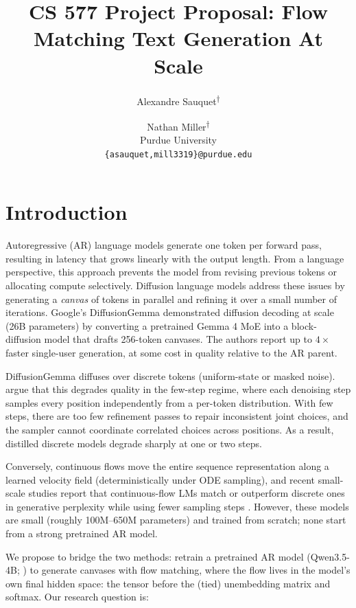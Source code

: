 \documentclass[11pt]{article}
\title{CS 577 Project Proposal: Flow Matching Text Generation At Scale}
\author{Alexandre Sauquet\textsuperscript{$\dagger$} \and Nathan Miller\textsuperscript{$\dagger$} \\
  Purdue University \\
  \texttt{\{asauquet,mill3319\}@purdue.edu}}
\begin{document}
\maketitle
\begingroup
\renewcommand\thefootnote{$\dagger$}
\endgroup

\section{Introduction}

Autoregressive (AR) language models generate one token per forward pass, resulting in latency that grows linearly with the output length. From a language perspective, this approach prevents the model from revising previous tokens or allocating compute selectively. Diffusion language models address these issues by generating a \emph{canvas} of tokens in parallel and refining it over a small number of iterations. Google's DiffusionGemma \citep{google2026diffusiongemma} demonstrated diffusion decoding at scale (26B parameters) by converting a pretrained Gemma 4 MoE into a block-diffusion model that drafts 256-token canvases. The authors report up to  $4\times$ faster single-user generation, at some cost in quality relative to the AR parent.

DiffusionGemma \citep{nie2025llada,ye2025dream} diffuses over discrete tokens (uniform-state or masked noise). \citet{lee2026flm} argue that this degrades quality in the few-step regime, where each denoising step samples every position independently from a per-token distribution. With few steps, there are too few refinement passes to repair inconsistent joint choices, and the sampler cannot coordinate correlated choices across positions. As a result, distilled discrete models degrade sharply at one or two steps.

Conversely, continuous flows move the entire sequence representation along a learned velocity field (deterministically under ODE sampling), and recent small-scale studies report that continuous-flow LMs match or outperform discrete ones in generative perplexity while using fewer sampling steps \citep{lee2026flm,hu2026elf}. However, these models are small (roughly 100M--650M parameters) and trained from scratch; none start from a strong pretrained AR model.

We propose to bridge the two methods: retrain a pretrained AR model (Qwen3.5-4B; \citealp{qwen2026qwen35}) to generate canvases with flow matching, where the flow lives in the model's own final hidden space: the tensor before the (tied) unembedding matrix and softmax.  Our research question is:
\end{document}

